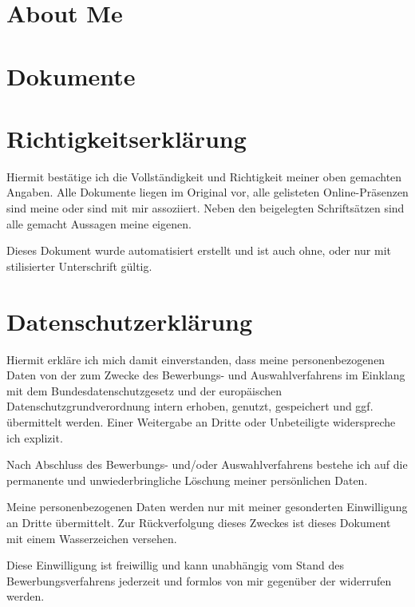 ﻿\documentclass[
	a4paper,
	fontsize=12
]{scrartcl}
\begin{document}
\endgroup %

\filbreak
\section{About Me}
\RecpSalutation
\bigskip

\CVAboutMe
\newpage


\section{Dokumente}

\newcommand{\RemainingPageHeight}{\dimexpr\pagegoal-\pagetotal-\baselineskip\relax}

\newcommand{\PageFillImage}[1]{%
	\begin{minipage}[b]{\textwidth}
		\center\fcolorbox{RoyalBlue}{white}{
			\texttt{[image: \\CVDataPath/\#1]}
		}
	\end{minipage}
	\newpage
}%

\CVDocs

\section{Richtigkeitserklärung}
Hiermit bestätige ich die Vollständigkeit und Richtigkeit meiner oben gemachten
Angaben. Alle Dokumente liegen im Original vor, alle gelisteten Online-Präsenzen
sind meine oder sind mit mir assoziiert. Neben den beigelegten Schriftsätzen sind alle gemacht Aussagen meine eigenen.

Dieses Dokument wurde automatisiert erstellt und ist auch ohne, oder nur mit
stilisierter Unterschrift gültig.

\section{Datenschutzerklärung}
Hiermit erkläre ich mich damit einverstanden, dass meine personenbezogenen Daten von der \RecpCompany{} zum Zwecke des Bewerbungs- und Auswahlverfahrens im Einklang mit dem Bundesdatenschutzgesetz und der europäischen Datenschutzgrundverordnung intern erhoben, genutzt, gespeichert und ggf. übermittelt werden.
Einer Weitergabe an Dritte oder Unbeteiligte widerspreche ich explizit.

Nach Abschluss des Bewerbungs- und/oder Auswahlverfahrens bestehe ich auf die permanente und unwiederbringliche Löschung meiner persönlichen Daten.

Meine personenbezogenen Daten werden nur mit meiner gesonderten Einwilligung
an Dritte übermittelt. Zur Rückverfolgung dieses Zweckes ist dieses Dokument
mit einem Wasserzeichen versehen.

Diese Einwilligung ist freiwillig und kann unabhängig vom Stand des Bewerbungsverfahrens
jederzeit und formlos von mir gegenüber der \RecpCompany{} widerrufen werden.
\vfill
\MySignature
\vfill\vfill\vfill
\end{document}
